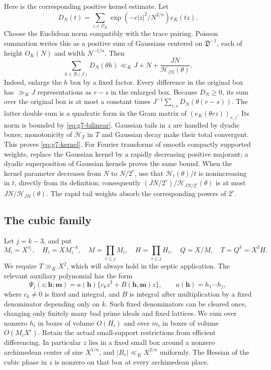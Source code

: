 \documentclass[11pt,reqno]{amsart}
\numberwithin{equation}{section}
\theoremstyle{definition}
\begin{document}
Here is the corresponding positive kernel estimate.  Let
\[
 D_N(t)=\sum_{z\in\mathcal O_K}
      \exp(-c|z|^2/N^{2/n})e_K(tz).
\]
Choose the Euclidean norm compatibly with the trace pairing.  Poisson
summation writes this as a positive sum of Gaussians centered on
$\mathfrak D^{-1}$, each of height $O_K(N)$ and width $N^{-1/n}$.
Then
\begin{equation}\label{eq:g7-kernel}
 \sum_{h\in\mathcal B(J)}D_N(\theta h)
 \ll_K J+N+\frac{JN}{\mathcal H_{JN}(\theta)}.
\end{equation}
Indeed, enlarge the $h$ box by a fixed factor.  Every difference in the
original box has $\gg_K J$ representations as $r-s$ in the enlarged box.
Because $D_N\ge0$, its sum over the original box is at most a constant times
$J^{-1}\sum_{r,s}D_N(\theta(r-s))$.  The latter double sum is a quadratic
form in the Gram matrix of $(e_K(\theta rz))_{r,z}$.  Its norm is bounded by
\eqref{eq:g7-bilinear}.  Gaussian tails in $z$ are handled by dyadic boxes;
monotonicity of $\mathcal H_T$ in $T$ and Gaussian decay make their total
convergent.  This proves \eqref{eq:g7-kernel}.
For Fourier transforms of smooth compactly supported weights, replace the
Gaussian kernel by a rapidly decreasing positive majorant; a dyadic
superposition of Gaussian kernels proves the same bound.  When the kernel
parameter decreases from $N$ to $N/2^r$, use that
$\mathcal H_t(\theta)/t$ is nonincreasing in $t$, directly from its
definition; consequently $(JN/2^r)/\mathcal H_{JN/2^r}(\theta)$
is at most $JN/\mathcal H_{JN}(\theta)$.  The rapid tail weights
absorb the corresponding powers of $2^r$.

\subsection{The cubic family}

Let $j=k-3$, and put
\[
 M_i=X^{\phi_i},\quad H_i=XM_i^{-k},\quad
 M=\prod_{i\le j}M_i,\quad H=\prod_{i\le j}H_i,\quad
 Q=X/M,\quad T=Q^k=X^3H.
\]
We require $T\gg_KX^2$, which will always hold in the septic application.
The relevant auxiliary polynomial has the form
\[
 \Psi_j(z;\mathbf h;\mathbf m)
   =a(\mathbf h)\{c_k z^3+B(\mathbf h,\mathbf m)z\},\qquad
 a(\mathbf h)=h_1\cdots h_j,
\]
where $c_k\ne0$ is fixed and integral, and $B$ is integral after multiplication
by a fixed denominator depending only on $k$.  Such fixed denominators can be
cleared once, changing only finitely many bad prime ideals and fixed lattices.
We sum over nonzero $h_i$ in boxes of volume $O(H_i)$ and over $m_i$ in boxes
of volume $O(M_iX^\epsilon)$.  Retain the actual small-support restrictions
from efficient differencing.  In particular $z$ lies in a fixed small box
around a nonzero archimedean center of size $X^{1/n}$, and
$|B_v|\ll_KX^{2/n}$ uniformly.  The Hessian of the cubic phase in $z$ is
nonzero on that box at every archimedean place.
\end{document}

